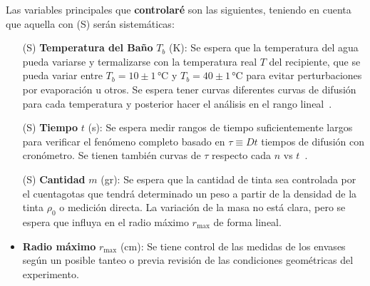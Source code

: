 \documentclass{article}[13pt]
\begin{document}
Las variables principales que \textbf{controlaré} son las siguientes, teniendo en cuenta que aquella con (S) serán sistemáticas:
\begin{itemize}
    \item[(S)] \textbf{Temperatura del Baño} $T_b$ (K): Se espera que la temperatura del agua pueda variarse y termalizarse con la temperatura real $T$ del recipiente, que se pueda variar entre $T_b = 10 \pm 1 \, \unit{\degreeCelsius}$ y $T_b = 40 \pm 1 \, \unit{\degreeCelsius}$ para evitar perturbaciones por evaporación u otros. Se espera tener curvas diferentes curvas de difusión para cada temperatura y posterior hacer el análisis en el rango lineal~\cite{leeInkDifussionWater2004}.
    \item[(S)] \textbf{Tiempo} $t$ (s): Se espera medir rangos de tiempo suficientemente largos para verificar el fenómeno completo basado en $\tau\equiv Dt$ tiempos de difusión con cronómetro. Se tienen también curvas de $\tau$ respecto cada $n$ vs $t$~\cite{leeInkDifussionWater2004}.
    \item[(S)] \textbf{Cantidad} $m$ (gr): Se espera que la cantidad de tinta sea controlada por el cuentagotas que tendrá determinado un peso a partir de la densidad de la tinta $\rho_0$ o medición directa. La variación de la masa no está clara, pero se espera que influya en el radio máximo $r_{\text{max}}$ de forma lineal.
    \item \textbf{Radio máximo} $r_{\text{max}}$ (cm): Se tiene control de las medidas de los envases según un posible tanteo o previa revisión de las condiciones geométricas del experimento.
\end{itemize}
\end{document}

